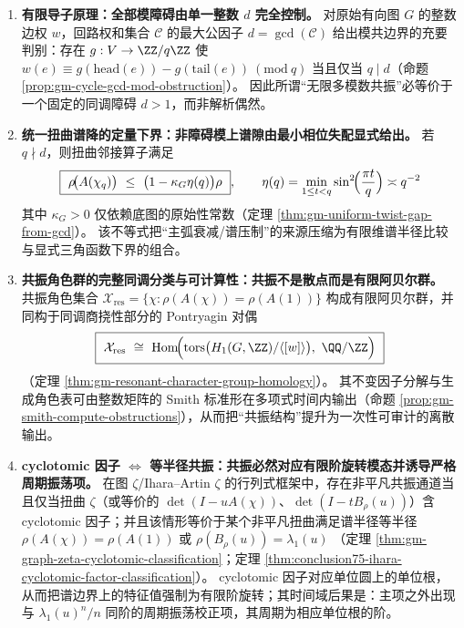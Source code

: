 \begin{enumerate}
  \item \textbf{有限导子原理：全部模障碍由单一整数 \texorpdfstring{$d$}{d} 完全控制。}
  对原始有向图 \(G\) 的整数边权 \(w\)，回路权和集合 \(\mathcal{C}\) 的最大公因子
  \(d=\gcd(\mathcal{C})\)
  给出模共边界的充要判别：存在 \(g:V\to\ZZ/q\ZZ\) 使
  \(w(e)\equiv g(\mathrm{head}(e))-g(\mathrm{tail}(e))\ (\mathrm{mod}\ q)\)
  当且仅当 \(q\mid d\)（命题 \ref{prop:gm-cycle-gcd-mod-obstruction}）。
  因此所谓“无限多模数共振”必等价于一个固定的同调障碍 \(d>1\)，而非解析偶然。

  \item \textbf{统一扭曲谱降的定量下界：非障碍模上谱隙由最小相位失配显式给出。}
  若 \(q\nmid d\)，则扭曲邻接算子满足
  \[
  \boxed{\ \rho\!\bigl(A(\chi_q)\bigr)\ \le\ \bigl(1-\kappa_G\eta(q)\bigr)\rho\ },
  \qquad
  \eta(q)=\min_{1\le t<q}\sin^2\!\Bigl(\frac{\pi t}{q}\Bigr)\asymp q^{-2}
  \]
  其中 \(\kappa_G>0\) 仅依赖底图的原始性常数（定理 \ref{thm:gm-uniform-twist-gap-from-gcd}）。
  该不等式把“主弧衰减/谱压制”的来源压缩为有限维谱半径比较与显式三角函数下界的组合。

  \item \textbf{共振角色群的完整同调分类与可计算性：共振不是散点而是有限阿贝尔群。}
  共振角色集合
  \(\mathcal{X}_{\mathrm{res}}=\{\chi:\rho(A(\chi))=\rho(A(1))\}\)
  构成有限阿贝尔群，并同构于同调商挠性部分的 Pontryagin 对偶
  \[
  \boxed{\ \mathcal{X}_{\mathrm{res}}\ \cong\ \mathrm{Hom}\!\Bigl(\mathrm{tors}\bigl(H_1(G,\ZZ)/\langle[w]\rangle\bigr),\ \QQ/\ZZ\Bigr)\ }
  \]
  （定理 \ref{thm:gm-resonant-character-group-homology}）。
  其不变因子分解与生成角色表可由整数矩阵的 Smith 标准形在多项式时间内输出（命题 \ref{prop:gm-smith-compute-obstructions}），从而把“共振结构”提升为一次性可审计的离散输出。

  \item \textbf{cyclotomic 因子 \texorpdfstring{$\Longleftrightarrow$}{<->} 等半径共振：共振必然对应有限阶旋转模态并诱导严格周期振荡项。}
  在图 \(\zeta\)/Ihara--Artin \(\zeta\) 的行列式框架中，存在非平凡共振通道当且仅当扭曲 \(\zeta\)（或等价的 \(\det(I-uA(\chi))\)、\(\det(I-tB_\rho(u))\)）含 cyclotomic 因子；并且该情形等价于某个非平凡扭曲满足谱半径等半径
  \(\rho(A(\chi))=\rho(A(1))\)
  或
  \(\rho(B_\rho(u))=\lambda_1(u)\)
  （定理 \ref{thm:gm-graph-zeta-cyclotomic-classification}；定理 \ref{thm:conclusion75-ihara-cyclotomic-factor-classification}）。
  cyclotomic 因子对应单位圆上的单位根，从而把谱边界上的特征值强制为有限阶旋转；其时间域后果是：主项之外出现与 \(\lambda_1(u)^n/n\) 同阶的周期振荡校正项，其周期为相应单位根的阶。


\end{enumerate}
